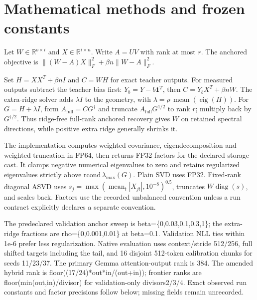 \documentclass[10pt]{article}
\begin{document}
\section{Mathematical methods and frozen constants}

Let $W\in\mathbb{R}^{o\times i}$ and $X\in\mathbb{R}^{i\times n}$. Write $A=UV$ with rank at most $r$. The anchored objective is $\|(W-A)X\|_F^2+\beta n\|W-A\|_F^2$.

Set $H=XX^T+\beta nI$ and $C=WH$ for exact teacher outputs. For measured outputs subtract the teacher bias first: $Y_b=Y-b\mathbf{1}^T$, then $C=Y_bX^T+\beta nW$. The extra-ridge solver adds $\lambda I$ to the geometry, with $\lambda=\rho\,\operatorname{mean}(\operatorname{eig}(H))$. For $G=H+\lambda I$, form $A_\mathrm{full}=CG^\dagger$ and truncate $A_\mathrm{full}G^{1/2}$ to rank $r$; multiply back by $G^{\dagger/2}$. Thus ridge-free full-rank anchored recovery gives $W$ on retained spectral directions, while positive extra ridge generally shrinks it.

The implementation computes weighted covariance, eigendecomposition and weighted truncation in FP64, then returns FP32 factors for the declared storage cast. It clamps negative numerical eigenvalues to zero and retains regularized eigenvalues strictly above $\mathrm{rcond}\,\lambda_{\max}(G)$. Plain SVD uses FP32. Fixed-rank diagonal ASVD uses $s_j=\max(\operatorname{mean}_t|X_{jt}|,10^{-8})^{0.5}$, truncates $W\operatorname{diag}(s)$, and scales back. Factors use the recorded unbalanced convention unless a run contract explicitly declares a separate convention.

The predeclared validation anchor sweep is beta=\{0,0.03,0.1,0.3,1\}; the extra-ridge fractions are rho=\{0,0.001,0.01\} at beta=0.1. Validation NLL ties within 1e-6 prefer less regularization. Native evaluation uses context/stride 512/256, full shifted targets including the tail, and 16 disjoint 512-token calibration chunks for seeds 11/23/37. The primary Gemma attention-output rank is 384. The amended hybrid rank is floor((17/24)*out*in/(out+in)); frontier ranks are floor(min(out,in)/divisor) for validation-only divisors2/3/4. Exact observed run constants and factor precisions follow below; missing fields remain unrecorded.
\end{document}
